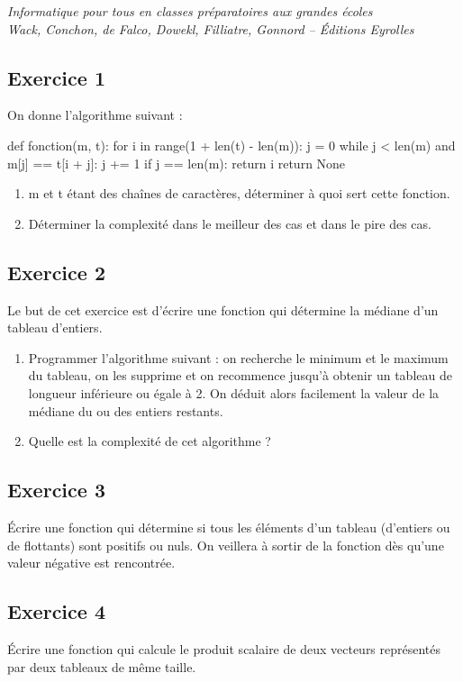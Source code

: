 \documentclass[10pt]{article}
\begin{document}

\begin{center}
\textit{Informatique pour tous en classes préparatoires aux grandes écoles\\
Wack, Conchon, de Falco, Dowekl, Filliatre, Gonnord -- Éditions Eyrolles}
\end{center}

 \renewcommand{\baselinestretch}{1.2}
\setlength{\parskip}{2ex plus 0.5ex minus 0.2ex}



\subsection*{Exercice 1}
On donne l'algorithme suivant :

\begin{py}
\begin{python}
def fonction(m, t):
    for i in range(1 + len(t) - len(m)):
        j = 0
        while j < len(m) and m[j] == t[i + j]:
            j += 1
        if j == len(m):
            return i
    return None
\end{python}
\end{py}
\begin{enumerate}
\item \textsf{m} et \textsf{t} étant des chaînes de caractères, déterminer à quoi sert cette fonction.
\item Déterminer la complexité dans le meilleur des cas et dans le pire des cas.
\end{enumerate}

\subsection*{Exercice 2}

Le but de cet exercice est d’écrire une fonction qui détermine la médiane d’un tableau
d’entiers.
\begin{enumerate}
\item Programmer l’algorithme suivant : on recherche le minimum et le maximum du tableau, on les supprime et on recommence jusqu’à obtenir un tableau de longueur inférieure ou égale à 2. On déduit alors facilement la valeur de la médiane du ou des entiers restants.
\item Quelle est la complexité de cet algorithme ? 
\end{enumerate}

\subsection*{Exercice 3}

Écrire une fonction qui détermine si tous les éléments d’un tableau (d’entiers ou de flottants)
sont positifs ou nuls. On veillera à sortir de la fonction dès qu’une valeur négative est rencontrée.

\subsection*{Exercice 4}

Écrire une fonction qui calcule le produit scalaire de deux vecteurs représentés par deux
tableaux de même taille.
\end{document}
